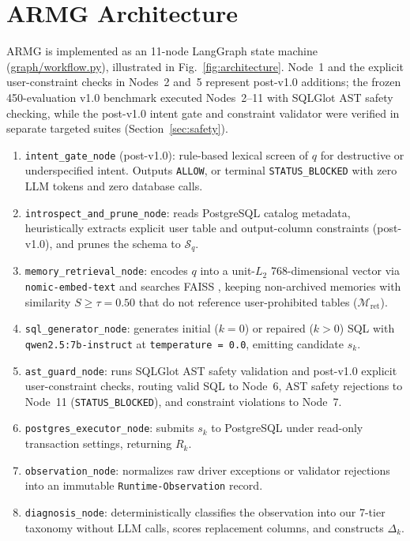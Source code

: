 \section{ARMG Architecture}
ARMG is implemented as an 11-node LangGraph \cite{langgraph2024} state machine (\url{graph/workflow.py}), illustrated in Fig.~\ref{fig:architecture}. Node~1 and the explicit user-constraint checks in Nodes~2 and~5 represent post-v1.0 additions; the frozen 450-evaluation v1.0 benchmark executed Nodes~2--11 with SQLGlot AST safety checking, while the post-v1.0 intent gate and constraint validator were verified in separate targeted suites (Section~\ref{sec:safety}).
\begin{enumerate}
\item \texttt{intent\_gate\_node} (post-v1.0): rule-based lexical screen of $q$ for destructive or underspecified intent. Outputs \texttt{ALLOW}, or terminal \texttt{STATUS\_\allowbreak{}BLOCKED} with zero LLM tokens and zero database calls.
\item \texttt{introspect\_and\_prune\_node}: reads PostgreSQL catalog metadata, heuristically extracts explicit user table and output-column constraints (post-v1.0), and prunes the schema to $\mathcal{S}_q$.
\item \texttt{memory\_retrieval\_node}: encodes $q$ into a unit-$L_2$ 768-dimensional vector via \texttt{nomic-\allowbreak{}embed-\allowbreak{}text} \cite{nussbaum2024nomic} and searches FAISS \cite{johnson2021faiss}, keeping non-archived memories with similarity $S \ge \tau = 0.50$ that do not reference user-prohibited tables ($\mathcal{M}_{\text{ret}}$).
\item \texttt{sql\_generator\_node}: generates initial ($k=0$) or repaired ($k>0$) SQL with \texttt{qwen2.5:\allowbreak{}7b-\allowbreak{}instruct} \cite{qwen2024qwen25} at \texttt{temperature = 0.0}, emitting candidate $s_k$.
\item \texttt{ast\_guard\_node}: runs SQLGlot \cite{mao2023sqlglot} AST safety validation and post-v1.0 explicit user-constraint checks, routing valid SQL to Node~6, AST safety rejections to Node~11 (\texttt{STATUS\_\allowbreak{}BLOCKED}), and constraint violations to Node~7.
\item \texttt{postgres\_executor\_node}: submits $s_k$ to PostgreSQL under read-only transaction settings, returning $R_k$.
\item \texttt{observation\_node}: normalizes raw driver exceptions or validator rejections into an immutable \texttt{Runtime-Observation} record.
\item \texttt{diagnosis\_node}: deterministically classifies the observation into our 7-tier taxonomy without LLM calls, scores replacement columns, and constructs $\Delta_k$.

\end{enumerate}
